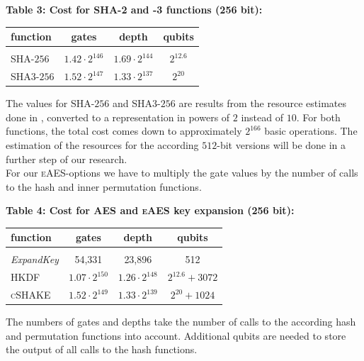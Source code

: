 \documentclass[a4paper,11pt]{article}
\begin{document}
\begin{otherlanguage}{english}
\begin{center}
\textbf{Table 3: Cost for SHA-2 and -3 functions (256 bit):} \\
\vspace{0.2cm}
  \begin{tabular}{l|c|c|c}
  function &  gates & depth & qubits \\ 
  \hline
    &  &  & \\ [-8pt]
  \textsc{SHA}-$256$ & $1.42 \cdot 2^{146}$ & $1.69 \cdot 2^{144}$ & $2^{12.6}$  \\  
  \textsc{SHA3}-$256$ & $1.52 \cdot 2^{147}$ & $1.33 \cdot 2^{137}$ & $2^{20}$  \\ 
  \end{tabular} 
\end{center}
\vspace{0.5cm}

\noindent
The values for \textsc{SHA}-$256$ and \textsc{SHA3}-$256$ are results from the resource estimates done in \cite{QSH}, converted to a representation in powers of $2$ instead of $10$. For both functions, the total cost comes down to approximately $2^{166}$ basic operations. The estimation of the resources for the according $512$-bit versions will be done in a further step of our research. \\

\noindent
For our \textsc{eAES}-options we have to multiply the gate values by the number of calls to the hash and inner permutation functions.

\begin{center}
\textbf{Table 4: Cost for \textsc{AES} and \textsc{eAES} key expansion (256 bit):} \\
\vspace{0.2cm}
  \begin{tabular}{l|c|c|c}
  function &  gates & depth & qubits \\ 
  \hline
    &  &  & \\ [-8pt]
  \textit{ExpandKey} & 54,331  &  23,896 & 512 \\
  \textsc{HKDF} & $1.07 \cdot 2^{150}$ & $1.26 \cdot 2^{148}$ & $2^{12.6} + 3072$  \\  
  \textsc{cSHAKE} & $1.52 \cdot 2^{149}$ & $1.33 \cdot 2^{139}$ & $2^{20} + 1024$  \\  
  \end{tabular} 
\end{center} 
\vspace{0.5cm}

\noindent
The numbers of gates and depths take the number of calls to the according hash and permutation functions into account. Additional qubits are needed to store the output of all calls to the hash functions.\\


\end{otherlanguage}
\end{document}
